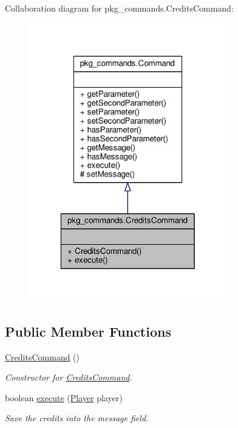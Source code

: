 Collaboration diagram for pkg\-\_\-commands.\-Credits\-Command\-:
\nopagebreak
\begin{figure}[H]
\begin{center}
\leavevmode
\includegraphics[width=244pt]{classpkg__commands_1_1CreditsCommand__coll__graph}
\end{center}
\end{figure}
\subsection*{Public Member Functions}
\begin{DoxyCompactItemize}
\item 
\hyperlink{classpkg__commands_1_1CreditsCommand_aa4338bdebb23612f95fa151ecd6f3bd2}{Credits\-Command} ()
\begin{DoxyCompactList}\small\item\em Constructor for \hyperlink{classpkg__commands_1_1CreditsCommand}{Credits\-Command}. \end{DoxyCompactList}\item 
boolean \hyperlink{classpkg__commands_1_1CreditsCommand_aad2b955c6c8a4c3536e6b937165b7790}{execute} (\hyperlink{classpkg__world_1_1Player}{Player} player)
\begin{DoxyCompactList}\small\item\em Save the credits into the message field. \end{DoxyCompactList}\end{DoxyCompactItemize}
